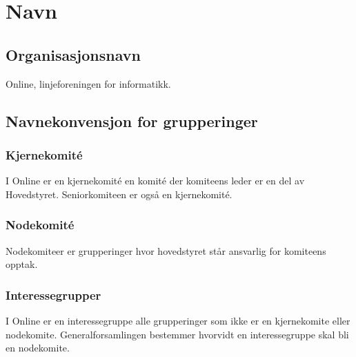 \chapter{Navn}
\section{Organisasjonsnavn}
\vspace{23pt}
Online, linjeforeningen for informatikk.




\section{Navnekonvensjon for grupperinger}
\vspace{23pt}

\subsection{Kjernekomité}

I Online er en kjernekomité en komité der komiteens leder er en del av Hovedstyret. Seniorkomiteen er også en kjernekomité. 

\subsection{Nodekomité}

Nodekomiteer er grupperinger hvor hovedstyret står ansvarlig for komiteens opptak.


\subsection{Interessegrupper}

I Online er en interessegruppe alle grupperinger som ikke er en kjernekomite eller nodekomite. Generalforsamlingen bestemmer hvorvidt en interessegruppe skal bli en nodekomite.


